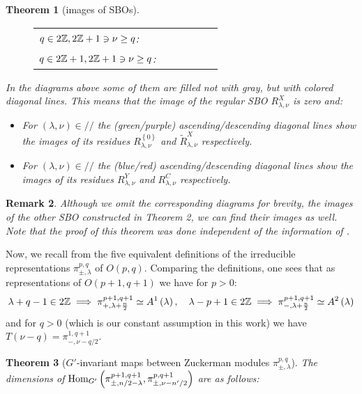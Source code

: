 \documentclass[12pt]{article} %
\newtheorem{theorem}{Theorem}
\newcommand{\Hom}{\mbox{\normalfont Hom}}
\newtheorem{remark}[theorem]{Remark}
\theoremstyle{definition}
\theoremstyle{exampstyle} \newtheorem{examp}[theorem]{Theorem}
\newcommand{\even}{2\Z}
\newcommand{\odd}{2\Z+1}
\renewcommand{\ss}{//}
\begin{document}
\begin{theorem}[images of SBOs]
\begin{figure}[H]
\begin{tabular}{p{4.5cm}p{2.5cm}p{2.5cm}p{2.5cm}p{2.5cm}p{2.5cm}}
		\vspace{-0.7cm}$q\in\even,\odd\ni\nu\ge q$:&\\
		\vspace{-0.7cm}$q\in\odd,\odd\ni\nu\ge q$:&\\
	\end{tabular}\end{figure}
	In the diagrams above some of them are filled not with gray, but with colored diagonal lines. This means that the image of the regular SBO $R_{\lambda,\nu}^X$ is zero and:
	\begin{itemize}
		\item For $(\lambda,\nu)\in\ss$ the (green/purple)
			ascending/descending diagonal lines show the images of its residues $R_{\lambda,\nu}^{ \left\{ 0 \right\}}$ and $\tilde{R}_{\lambda,\nu}^X$ 
			respectively.
		\item For $(\lambda,\nu)\in\ss$ the (blue/red) ascending/descending diagonal lines show the images of its residues $R_{\lambda,\nu}^{Y}$ and ${R}_{\lambda,\nu}^C$ 
			respectively.
	\end{itemize}
	
	
\end{theorem}
\begin{remark}
	Although we omit the corresponding diagrams for brevity, the images of the other SBO constructed in Theorem 2, we can find their images as well. Note that
	the proof of this theorem was done \textit{independent of} the information of \cite{howe1993homogeneous}.
\end{remark}
Now, we recall from \cite{KO2} the five equivalent definitions of the
irreducible representations $\pi_{\pm,\lambda}^{p,q}$ of $O(p,q)$. Comparing the definitions, one sees that as 
representations of $O(p+1,q+1)$ we have for $p>0$:
\begin{equation*}
	\lambda+q-1\in2\mathbb{Z}\implies\pi_{+,\lambda+\frac{n}{2}}^{p+1,q+1}\simeq A^1\left(\lambda  \right),\quad\lambda-p+1\in2\mathbb{Z}\implies\pi_{-,\lambda+\frac{n}{2} }^{p+1,q+1}\simeq A^2\left(\lambda\right)
\end{equation*}
and for $q>0$ (which is our constant assumption in this work) we have $T(\nu-q)=\pi_{-,\nu-q/2}^{1,q+1}$.

\begin{theorem}[$G'$-invariant maps between Zuckerman modules $\pi_{\pm,\lambda}^{p,q}$]
	The dimensions of $\Hom_{G'}\left(\pi_{\pm,{n}/{2}-\lambda}^{p+1,q+1} ,\pi_{\pm,\nu-{n'}/{2}}^{p,q+1} \right)$
	are as follows:\newline
{}
\end{theorem}


\end{document}
